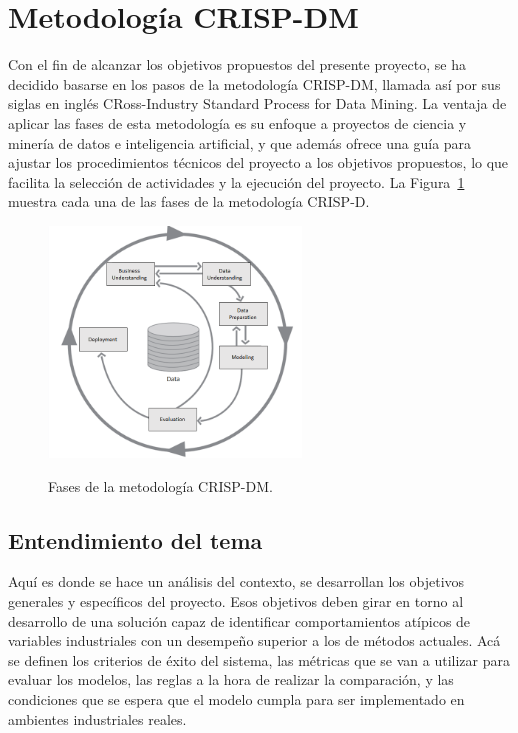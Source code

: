 \documentclass[11pt,a4paper,spanish]{book}
\numberwithin{equation}{chapter}
\numberwithin{figure}{chapter}
\begin{document}
\section{Metodología CRISP-DM}

Con el fin de alcanzar los objetivos propuestos del presente proyecto, se ha decidido 
basarse en los pasos de la metodología  CRISP-DM, llamada así por sus siglas en inglés 
CRoss-Industry Standard Process for Data Mining. La ventaja de aplicar las fases de esta
metodología es su enfoque a proyectos de ciencia y minería de datos e inteligencia 
artificial, y que además ofrece una guía para ajustar los procedimientos técnicos del 
proyecto a los objetivos propuestos, lo que facilita la selección de actividades y 
la ejecución del proyecto. La Figura~\ref{fig:figCrispdm} muestra cada una de las 
fases de la metodología 
CRISP-D.


\begin{figure}[h]
    \caption{Fases de la metodología {CRISP-DM}. \protect\cite{chapman2000crisp}}
    \centering
    \includegraphics[width=0.6\textwidth]{media/crisp-dm.png}
    \label{fig:figCrispdm}
\end{figure}



\subsection{Entendimiento del tema}

Aquí es donde se hace un análisis del contexto, se desarrollan los objetivos generales 
y específicos del proyecto. Esos objetivos deben girar en torno al desarrollo de una 
solución capaz de identificar comportamientos atípicos de variables industriales con un 
desempeño superior a los de métodos actuales. Acá se definen los criterios de éxito del
sistema, las métricas que se van a utilizar para evaluar los modelos, las reglas a la 
hora de realizar la comparación, y las condiciones que se espera que el modelo cumpla 
para ser implementado en ambientes industriales reales. 
\end{document}
